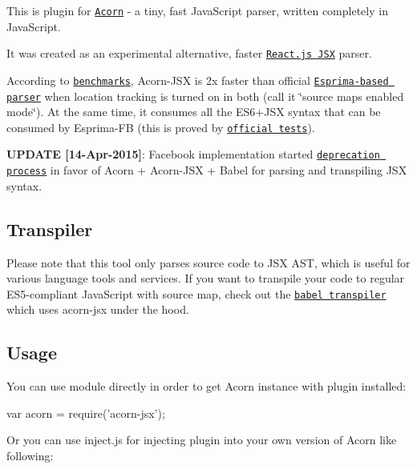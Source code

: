 \href{https://travis-ci.org/RReverser/acorn-jsx}{\tt } \href{https://www.npmjs.org/package/acorn-jsx}{\tt }

This is plugin for \href{http://marijnhaverbeke.nl/acorn/}{\tt Acorn} -\/ a tiny, fast Java\+Script parser, written completely in Java\+Script.

It was created as an experimental alternative, faster \href{http://facebook.github.io/react/docs/jsx-in-depth.html}{\tt React.\+js J\+SX} parser.

According to \href{https://github.com/RReverser/acorn-jsx/blob/master/test/bench.html}{\tt benchmarks}, Acorn-\/\+J\+SX is 2x faster than official \href{https://github.com/facebook/esprima}{\tt Esprima-\/based parser} when location tracking is turned on in both (call it \char`\"{}source maps enabled mode\char`\"{}). At the same time, it consumes all the E\+S6+\+J\+SX syntax that can be consumed by Esprima-\/\+FB (this is proved by \href{https://github.com/RReverser/acorn-jsx/blob/master/test/tests-jsx.js}{\tt official tests}).

{\bfseries U\+P\+D\+A\+TE \mbox{[}14-\/\+Apr-\/2015\mbox{]}}\+: Facebook implementation started \href{https://github.com/facebook/esprima/issues/111}{\tt deprecation process} in favor of Acorn + Acorn-\/\+J\+SX + Babel for parsing and transpiling J\+SX syntax.

\subsection*{Transpiler}

Please note that this tool only parses source code to J\+SX A\+ST, which is useful for various language tools and services. If you want to transpile your code to regular E\+S5-\/compliant Java\+Script with source map, check out the \href{https://babeljs.io/}{\tt babel transpiler} which uses {\ttfamily acorn-\/jsx} under the hood.

\subsection*{Usage}

You can use module directly in order to get Acorn instance with plugin installed\+:


\begin{DoxyCode}
var acorn = require('acorn-jsx');
\end{DoxyCode}


Or you can use {\ttfamily inject.\+js} for injecting plugin into your own version of Acorn like following\+:


